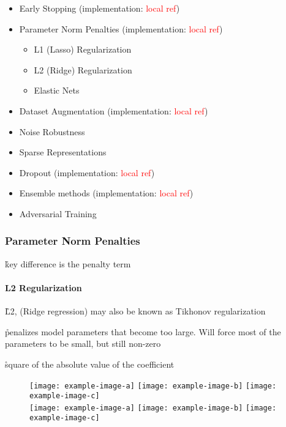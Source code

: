 \begin{itemize}[noitemsep,topsep=0pt]
	\item Early Stopping (implementation: \textcolor{red}{local ref})
	\item Parameter Norm Penalties (implementation: \textcolor{red}{local ref})
	\begin{itemize}[noitemsep,topsep=0pt]
		\item L1 (Lasso) Regularization
		\item L2 (Ridge) Regularization
		\item Elastic Nets
	\end{itemize}
	\item Dataset Augmentation (implementation: \textcolor{red}{local ref})
	\item Noise Robustness
	\item Sparse Representations
	\item Dropout (implementation: \textcolor{red}{local ref})
	\item Ensemble methods (implementation: \textcolor{red}{local ref})
	\item Adversarial Training
\end{itemize}



\subsubsection{Parameter Norm Penalties}

\r{key difference is the penalty term}


\paragraph{L2 Regularization}


\r{L2, ({Ridge regression}) may also be known as {Tikhonov regularization}}

\r{penalizes model parameters that become too large. Will force most of the parameters to be small, but still non-zero}

\r{square of the absolute value of the coefficient}

\begin{figure}[htp]
	\centering
	\texttt{[image: example-image-a]}\hfil
	\texttt{[image: example-image-b]}\hfil
	\texttt{[image: example-image-c]}\hfil\\
	\medskip
	\texttt{[image: example-image-a]}\hfil
	\texttt{[image: example-image-b]}\hfil
	\texttt{[image: example-image-c]}\hfil
	\caption{}
	\label{fig:basics_regularization_l2_example}
\end{figure}


